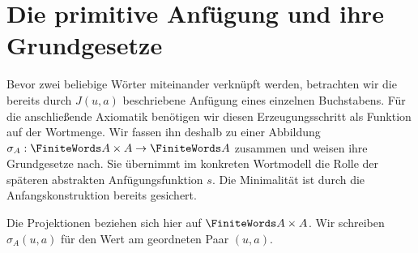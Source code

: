 \section{Die primitive Anfügung und ihre Grundgesetze}

Bevor zwei beliebige Wörter miteinander verknüpft werden, betrachten wir
die bereits durch \(J(u,a)\) beschriebene Anfügung eines einzelnen
Buchstabens. Für die anschließende Axiomatik benötigen wir diesen
Erzeugungsschritt als Funktion auf der Wortmenge. Wir fassen ihn deshalb
zu einer Abbildung \(\sigma_A:\FiniteWords A\times A\to\FiniteWords A\)
zusammen und weisen ihre Grundgesetze nach. Sie übernimmt im konkreten
Wortmodell die Rolle der späteren abstrakten Anfügungsfunktion \(s\).
Die Minimalität ist durch die Anfangskonstruktion bereits gesichert.

\noindent\begin{minipage}{\linewidth}
\end{minipage}\par
\begin{tabproofwide}
\end{tabproofwide}

\noindent\begin{minipage}{\linewidth}
\end{minipage}\par
Die Projektionen beziehen sich hier auf \(\FiniteWords A\times A\).
Wir schreiben \(\sigma_A(u,a)\) für den Wert am geordneten Paar \((u,a)\).


